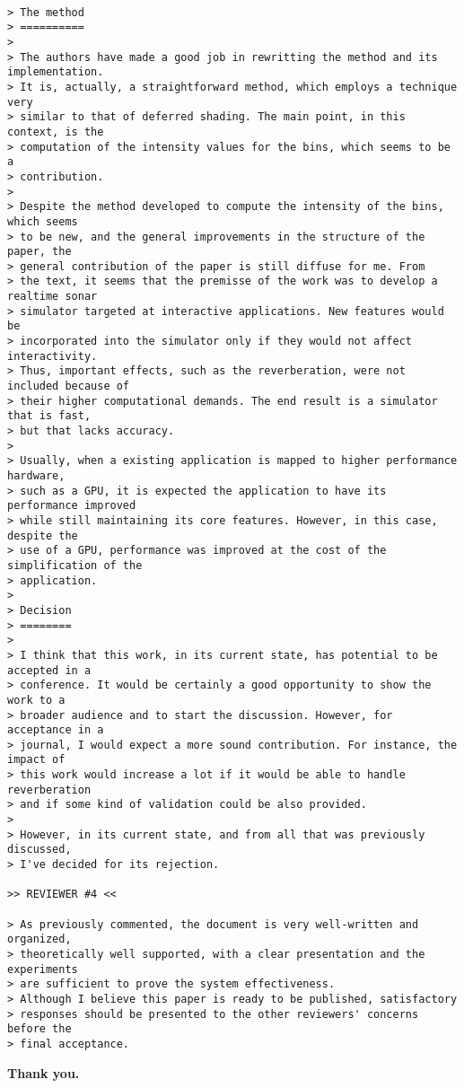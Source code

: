\documentclass{article}
\begin{document}
\begin{verbatim}

> The method
> ==========
>
> The authors have made a good job in rewritting the method and its implementation.
> It is, actually, a straightforward method, which employs a technique very
> similar to that of deferred shading. The main point, in this context, is the
> computation of the intensity values for the bins, which seems to be a
> contribution.
>
> Despite the method developed to compute the intensity of the bins, which seems
> to be new, and the general improvements in the structure of the paper, the
> general contribution of the paper is still diffuse for me. From
> the text, it seems that the premisse of the work was to develop a realtime sonar
> simulator targeted at interactive applications. New features would be
> incorporated into the simulator only if they would not affect interactivity.
> Thus, important effects, such as the reverberation, were not included because of
> their higher computational demands. The end result is a simulator that is fast,
> but that lacks accuracy.
>
> Usually, when a existing application is mapped to higher performance hardware,
> such as a GPU, it is expected the application to have its performance improved
> while still maintaining its core features. However, in this case, despite the
> use of a GPU, performance was improved at the cost of the simplification of the
> application.
>
> Decision
> ========
>
> I think that this work, in its current state, has potential to be accepted in a
> conference. It would be certainly a good opportunity to show the work to a
> broader audience and to start the discussion. However, for acceptance in a
> journal, I would expect a more sound contribution. For instance, the impact of
> this work would increase a lot if it would be able to handle reverberation
> and if some kind of validation could be also provided.
>
> However, in its current state, and from all that was previously discussed,
> I've decided for its rejection.

>> REVIEWER #4 <<

> As previously commented, the document is very well-written and organized,
> theoretically well supported, with a clear presentation and the experiments
> are sufficient to prove the system effectiveness.
> Although I believe this paper is ready to be published, satisfactory
> responses should be presented to the other reviewers' concerns before the
> final acceptance.

\end{verbatim}

\textbf{Thank you.}
\end{document}

